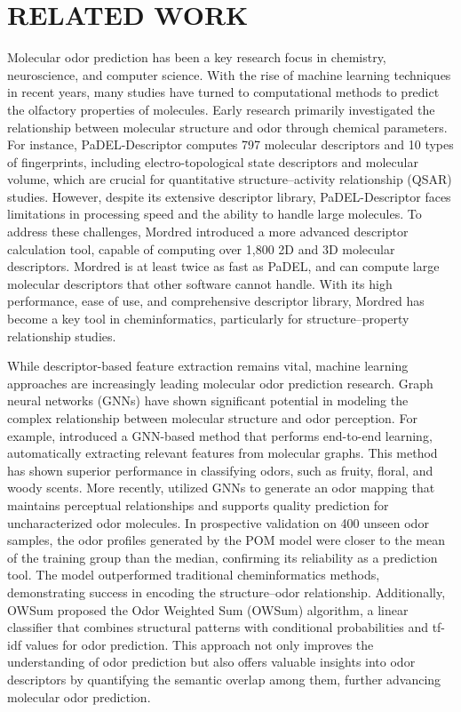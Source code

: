 \section{RELATED WORK}
Molecular odor prediction has been a key research focus in chemistry, neuroscience, and computer science. With the rise of machine learning techniques in recent years, many studies have turned to computational methods to predict the olfactory properties of molecules. Early research primarily investigated the relationship between molecular structure and odor through chemical parameters. For instance, PaDEL-Descriptor\cite{7} computes 797 molecular descriptors and 10 types of fingerprints, including electro-topological state descriptors and molecular volume, which are crucial for quantitative structure–activity relationship (QSAR) studies. However, despite its extensive descriptor library, PaDEL-Descriptor faces limitations in processing speed and the ability to handle large molecules. To address these challenges, Mordred\cite{8} introduced a more advanced descriptor calculation tool, capable of computing over 1,800 2D and 3D molecular descriptors. Mordred is at least twice as fast as PaDEL, and can compute large molecular descriptors that other software cannot handle. With its high performance, ease of use, and comprehensive descriptor library, Mordred has become a key tool in cheminformatics, particularly for structure–property relationship studies.

While descriptor-based feature extraction remains vital, machine learning approaches are increasingly leading molecular odor prediction research. Graph neural networks (GNNs)\cite{9,10} have shown significant potential in modeling the complex relationship between molecular structure and odor perception. For example,\cite{9} introduced a GNN-based method that performs end-to-end learning, automatically extracting relevant features from molecular graphs. This method has shown superior performance in classifying odors, such as fruity, floral, and woody scents. More recently,\cite{10} utilized GNNs to generate an odor mapping that maintains perceptual relationships and supports quality prediction for uncharacterized odor molecules. In prospective validation on 400 unseen odor samples, the odor profiles generated by the POM model were closer to the mean of the training group than the median, confirming its reliability as a prediction tool. The model outperformed traditional cheminformatics methods, demonstrating success in encoding the structure–odor relationship. Additionally, OWSum\cite{11} proposed the Odor Weighted Sum (OWSum) algorithm, a linear classifier that combines structural patterns with conditional probabilities and tf-idf values for odor prediction. This approach not only improves the understanding of odor prediction but also offers valuable insights into odor descriptors by quantifying the semantic overlap among them, further advancing molecular odor prediction.